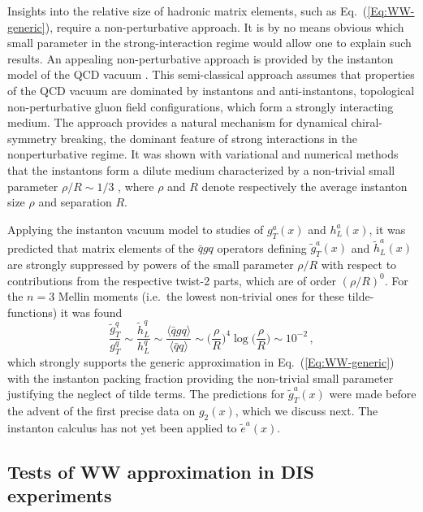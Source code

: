 \documentclass[a4paper,11pt]{article}
\newcommand{\be}{\begin{equation}}
\newcommand{\ee}{\end{equation}}
\newcommand{\la}{\langle}
\newcommand{\ra}{\rangle}
\newcommand{\gs}[1]{{\color[rgb]{0.65,0,0.65}#1}}
\begin{document}
Insights into the relative size of hadronic matrix elements, such as
Eq.~(\ref{Eq:WW-generic}), require a non-perturbative approach. It is
by no means obvious which small parameter in the strong-interaction
regime would allow one to explain such results. An appealing
non-perturbative approach is provided by the instanton model of
the QCD vacuum \cite{Shuryak:1981ff,Diakonov:1983hh,Diakonov:1995qy}.
This semi-classical approach assumes that properties of the QCD vacuum
are dominated by instantons and anti-instantons, topological non-perturbative
gluon field configurations, which form a strongly interacting medium.
The approach provides a natural mechanism for dynamical chiral-symmetry
breaking, the dominant feature of strong interactions in the nonperturbative
regime. It was shown with variational and numerical methods that the
instantons form a dilute medium characterized by a non-trivial small parameter
$\rho/R\sim1/3$ \cite{Shuryak:1981ff,Diakonov:1983hh,Diakonov:1995qy},
where $\rho$ and $R$ denote respectively the average instanton size $\rho$
and separation $R$.

Applying the instanton vacuum model to studies of $g_T^a(x)$ and $h_L^a(x)$,
it was predicted that matrix elements of the $\bar{q}gq$ operators defining
$\tilde{g}_T^a(x)$ \cite{Balla:1997hf} and $\tilde{h}_L^a(x)$
\cite{Dressler:1999hc} are strongly suppressed by powers of the small
parameter $\rho/R$ with respect to contributions from the
respective twist-2 parts, which are of order $(\rho/R)^0$.
\gs{For the $n = 3$ Mellin moments (i.e.\ the lowest non-trivial ones for 
these tilde-functions) it was found} \cite{Balla:1997hf,Dressler:1999hc}
\be\label{Eq:WW-instanoton}
	\frac{\tilde{g}_T^q}{g_T^q} \sim \frac{\tilde{h}_L^q}{h_L^q}
	\sim \frac{\la\bar{q}gq\ra}{\la\bar{q}q\ra} \sim
	\biggl(\frac{\rho}{R}\biggr)^{\!4} \log\biggl(\frac{\rho}{R}\biggr)
	\sim 10^{-2} \, ,
\ee
which strongly supports the generic approximation
in Eq.~(\ref{Eq:WW-generic}) with the instanton packing fraction providing
the non-trivial small parameter justifying the neglect of tilde terms.
The predictions for $\tilde{g}_T^a(x)$ \cite{Balla:1997hf}
were made before the advent of the first precise data on $g_2(x)$,
which we discuss next.
The instanton calculus has not yet been applied to $\tilde{e}^a(x)$.


%
\subsection{Tests of WW approximation in DIS experiments}
\label{Sec-3.4:WW-classic-experiment}
\end{document}
